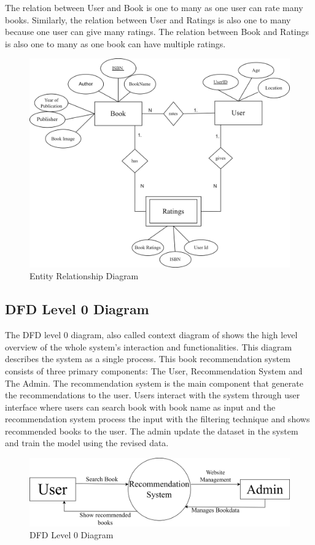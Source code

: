  The relation between User and Book is one to many as one user can rate many books. Similarly, the relation between User and Ratings is also one to many because one user can give many ratings. The relation between Book and Ratings is also one to many as one book can have multiple ratings.
\vspace{2cm}
\begin{figure}[h]
    \centering
    \includegraphics[width=1\linewidth]{img/Graphics/ER_brs.png}
    \caption{Entity Relationship Diagram}
    \label{Entity}
\end{figure}
\newpage

\subsection{DFD Level 0 Diagram}
The DFD level 0 diagram, also called context diagram of shows the high level overview of the whole system's interaction and functionalities. This diagram describes the system as a single process. This book recommendation system consists of three primary components: The User, Recommendation System and The Admin. The recommendation system is the main component that generate the recommendations to the user. Users interact with the system through user interface where users can search book with book name as input and the recommendation system process the input with the filtering technique and shows recommended books to the user. The admin update the dataset in the system and train the model using the revised data.
\vspace{2cm}
\begin{figure}[h]
    \centering
    \includegraphics[width=1\linewidth]{img/Graphics/DFD_Level_0.drawio.png}
    \caption{DFD Level 0 Diagram}
    \label{DFD level 0}
\end{figure}
\newpage

